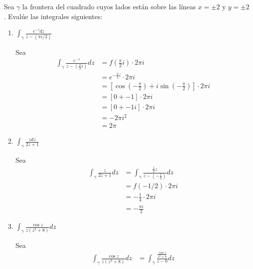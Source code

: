 




\begin{problema}
    Sea $\gamma$ la frontera del cuadrado cuyos lados están sobre las líneas $x=\pm 2$ y $ y=\pm 2$. Evalúe las integrales siguientes:
    \begin{enumerate}
        \item $\int_\gamma \frac{e^{-z} d z}{z-(\pi i / 2)}$
        \begin{sol}
            Sea
            \begin{align*}
                \int_\gamma \frac{e^{-z}}{z-(\frac{\pi}{2}i)}dz &= f\left(\frac{\pi}{2}i\right)\cdot 2\pi i\\
                &= e^{-\frac{\pi}{2}i}\cdot 2\pi i\\
                &= \left[\cos\left(-\frac{\pi}{2}\right)+ i \sin\left(-\frac{\pi}{2}\right)\right]\cdot 2\pi i\\
                &= \left[0+ -1\right]\cdot 2\pi i\\
                &= \left[0+ -1 i\right]\cdot 2\pi i\\
                &= -2\pi i^2\\
                &= 2\pi
            \end{align*}
        \end{sol}
        \item $\int_\gamma \frac{z d z}{2 z+1}$
        \begin{sol}
            Sea
            \begin{align*}
                \int_\gamma \frac{z}{2 z+1} dz &= \int_\gamma \frac{\frac{1}{2}z}{z-\left(-\frac{1}{2}\right)} dz\\
                &= f(-1/2)\cdot 2\pi i\\
                &= -\frac{1}{4}\cdot 2\pi i\\
                &= -\frac{\pi i}{2}
            \end{align*}
        \end{sol}
        \item $\int_\gamma \frac{\cos z }{z\left(z^2+8\right)}dz$
        \begin{sol}
            Sea
            \begin{align*}
                \int_\gamma\frac{\cos z }{z\left(z^2+8\right)}dz &=  \int_\gamma\frac{\frac{\cos z}{z^2+8}}{z-0}dz\\

\end{align*}
\end{sol}
\end{enumerate}
\end{problema}
